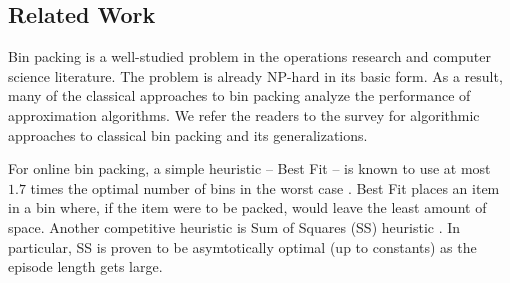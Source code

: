 \subsection{Related Work}
Bin packing is a well-studied problem in the operations research and computer science literature. 
The problem is already NP-hard in its basic form. As a result, many of the classical approaches to bin packing analyze the performance of approximation algorithms. We refer the readers to the survey \cite{Coffmanetal2013} for algorithmic approaches to classical bin packing and its generalizations.   

For online bin packing, a simple heuristic -- Best Fit -- is known to use at most $1.7$ times the optimal number of bins in the worst case \cite{Johnsonetal1974}. Best Fit places an item in a bin where, if the item were to be packed, would leave the least amount of space.
Another competitive heuristic is Sum of Squares (SS) heuristic \cite{csirik2006sum}. In particular, SS is proven to be asymtotically optimal (up to constants) as the episode length gets large.

